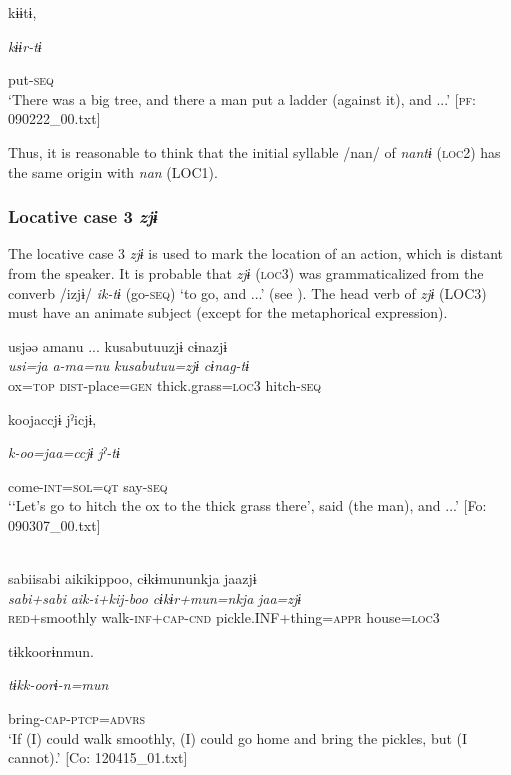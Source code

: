 \begin{table}
      kɨɨtɨ,

      \textit{kɨɨr-tɨ}

      put-\textsc{seq}\\
\glt ‘There was a big tree, and there a man put a ladder (against it), and ...’ [\textsc{pf}: 090222\_00.txt]
\z

Thus, it is reasonable to think that the initial syllable /nan/ of \textit{nantɨ} (\textsc{loc}2) has the same origin with \textit{nan} (LOC1).

\subsubsection{Locative case 3 \textit{zjɨ}}

The locative case 3 \textit{zjɨ} is used to mark the location of an action, which is distant from the speaker. It is probable that \textit{zjɨ} (\textsc{loc}3) was grammaticalized from the converb /izjɨ/ \textit{ik-tɨ} (go-\textsc{seq}) ‘to go, and ...’ (see ). The head verb of \textit{zjɨ} (LOC3) must have an animate subject (except for the metaphorical expression).

\ea\label{ex:6-67}
\ea {\TM}  usjəə  amanu ...  kusabutuuzjɨ  cɨnazjɨ\\
\glll \textit{usi=ja}  \textit{a-ma=nu}  \textit{kusabutuu=zjɨ}  \textit{cɨnag-tɨ}\\
ox=\textsc{top}  \textsc{dist}-place=\textsc{gen}  thick.grass=\textsc{loc}3  hitch-\textsc{seq}

      koojaccjɨ  jˀicjɨ,

      \textit{k-oo=jaa=ccjɨ}  \textit{jˀ-tɨ}

      come-\textsc{int}=\textsc{sol}=\textsc{qt}  say-\textsc{seq}\\
\glt ‘‘Let’s go to hitch the ox to the thick grass there’, said (the man), and ...’ [Fo: 090307\_00.txt]
\z

\ex\relax[= (\ref{ex:4-54}b)]\\
{\TM}
\glll  sabiisabi  aikikippoo,  cɨkɨmununkja  jaazjɨ\\
\textit{sabi+sabi}  \textit{aik-i+kij-boo}  \textit{cɨkɨr+mun=nkja}  \textit{jaa=zjɨ}\\
\textsc{red}+smoothly  walk-\textsc{inf}+\textsc{cap}-\textsc{cnd}  pickle.INF+thing=\textsc{appr}  house=\textsc{loc}3

      tɨkkoorɨnmun.

      \textit{tɨkk-oorɨ-n=mun}

      bring-\textsc{cap}-\textsc{ptcp}=\textsc{advrs}\\
\glt ‘If (I) could walk smoothly, (I) could go home and bring the pickles, but (I cannot).’ [Co: 120415\_01.txt]
\z


\end{table}
